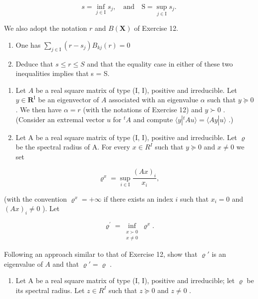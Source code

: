 \[
s = \inf _ {j \in \mathrm{I}} s _ {j}, \quad \text {and} \quad \mathrm{S} = \sup _ {j \in \mathrm{I}} s _ {j}.
\]

We also adopt the notation \(r\) and \(B(\mathbf{X})\) of Exercise 12.

\begin{enumerate}
\def\labelenumi{\alph{enumi})}
\item
  One has \(\sum_{j\in \mathrm{I}}(r - s_j)B_{kj}(r) = 0\)
\item
  Deduce that \(s \leqslant r \leqslant S\) and that the equality case in either of these two inequalities implies that s = S.
\end{enumerate}

\begin{enumerate}
\def\labelenumi{\arabic{enumi})}
\setcounter{enumi}{16}
\item
  Let \(A\) be a real square matrix of type (I, I), positive and irreducible. Let \(y \in \mathbf{R}^{\mathrm{I}}\) be an eigenvector of \(A\) associated with an eigenvalue \(\alpha\) such that \(y \succcurlyeq 0\) . We then have \(\alpha = r\) (with the notations of Exercise 12) and \(y \succ 0\) . (Consider an extremal vector \(u\) for \(^{t}A\) and compute \(\langle y|^{t}Au\rangle = \langle Ay|u\rangle\) .)
\item
  Let A be a real square matrix of type (I, I), positive and irreducible. Let \(\varrho\) be the spectral radius of A. For every \(x \in R^{I}\) such that \(y \succcurlyeq 0\) and \(x \neq 0\) we set
\end{enumerate}

\[
\varrho^ {x} = \sup _ {i \in \mathrm{I}} \frac {(A x) _ {i}}{x _ {i}},
\]

(with the convention \(\varrho^x = +\infty\) if there exists an index \(i\) such that \(x_i = 0\) and \((Ax)_i \neq 0\) ). Let

\[
\varrho^{\prime} = \inf_{\substack{x\succ 0\\ x\neq 0}}\varrho^{x}.
\]

Following an approach similar to that of Exercise 12, show that \(\varrho'\) is an eigenvalue of \(A\) and that \(\varrho' = \varrho\) .

\begin{enumerate}
\def\labelenumi{\arabic{enumi})}
\setcounter{enumi}{18}
\tightlist
\item
  Let A be a real square matrix of type (I, I), positive and irreducible; let \(\varrho\) be its spectral radius. Let \(z \in R^{I}\) such that \(z \succcurlyeq 0\) and \(z \neq 0\) .
\end{enumerate}

